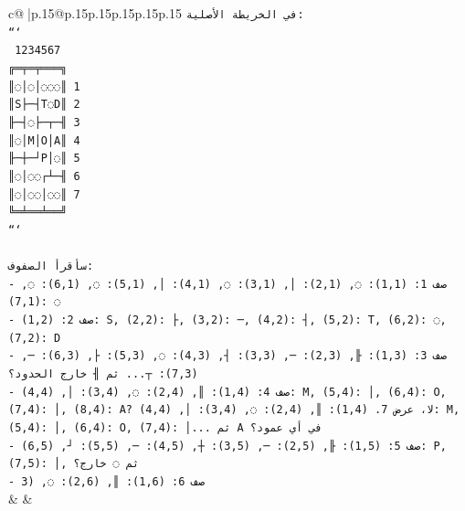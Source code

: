 \documentclass{article}
\begin{document}
{\begin{supertabular}{c@{$\;$}|p{.15\linewidth}@{}p{.15\linewidth}p{.15\linewidth}p{.15\linewidth}p{.15\linewidth}p{.15\linewidth}}
{{{\texttt{في الخريطة الأصلية:} \\
\texttt{```} \\
\texttt{ 1234567} \\
\texttt{╔═╤═╤═══╗} \\
\texttt{║◌│◌│◌◌◌║ 1} \\
\texttt{║S├─┤T◌D║ 2} \\
\texttt{╟─┤◌├─┬─╢ 3} \\
\texttt{║◌│M│O│A║ 4} \\
\texttt{╟─┼─┘P│◌║ 5} \\
\texttt{║◌│◌◌┌┴─╢ 6} \\
\texttt{║◌│◌◌│◌◌║ 7} \\
\texttt{╚═╧══╧══╝} \\
\texttt{```} \\
\\ 
\texttt{سأقرأ الصفوف:} \\
\texttt{{-} صف 1: (1,1): ◌, (2,1): │, (3,1): ◌, (4,1): │, (5,1): ◌, (6,1): ◌, (7,1): ◌} \\
\texttt{{-} صف 2: (1,2): S, (2,2): ├, (3,2): ─, (4,2): ┤, (5,2): T, (6,2): ◌, (7,2): D} \\
\texttt{{-} صف 3: (1,3): ╟, (2,3): ─, (3,3): ┤, (4,3): ◌, (5,3): ├, (6,3): ─, (7,3): ┬... ثم ╢ خارج الحدود؟} \\
\texttt{{-} صف 4: (1,4): ║, (2,4): ◌, (3,4): │, (4,4): M, (5,4): │, (6,4): O, (7,4): │, (8,4): A? لا، عرض 7. (1,4): ║, (2,4): ◌, (3,4): │, (4,4): M, (5,4): │, (6,4): O, (7,4): │... ثم A في أي عمود؟} \\
\texttt{{-} صف 5: (1,5): ╟, (2,5): ─, (3,5): ┼, (4,5): ─, (5,5): ┘, (6,5): P, (7,5): │, ثم ◌ خارج؟} \\
\texttt{{-} صف 6: (1,6): ║, (2,6): ◌, (3} \\
            }
        }
    }
    & & \\ \\


\end{supertabular}}
\end{document}
